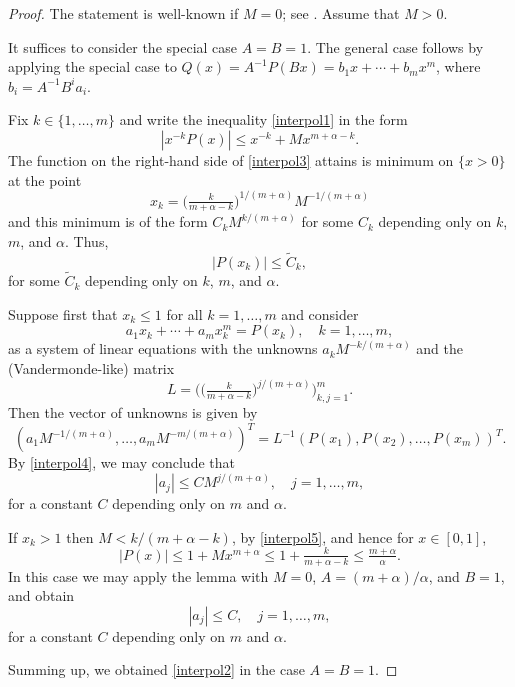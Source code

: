 \documentclass[12pt]{amsart}
\theoremstyle{plain}
\theoremstyle{definition}
\numberwithin{equation}{section}
\begin{document}
\begin{proof}
The statement is well-known if $M=0$; see \cite[Lemma 3.4]{ParusinskiRainerHyp}. Assume that $M>0$.

It suffices to consider the special case $A=B=1$.  
The general case follows by applying the special case to $Q(x)= A^{-1} P(Bx) =  b_1 x + \cdots + b_{m} x^{m}$, where 
$b_i= A^{-1} B^i  {a_i}$.  

Fix $k \in \{1,\ldots,m\}$ and write the inequality \eqref{interpol1} in the form 
\begin{equation} \label{interpol3}
  |x^{-k} P(x)| \le x^{-k} + M x^{m+{\alpha}-k}.
\end{equation}
The function on the right-hand side of \eqref{interpol3} attains is minimum on $\{x>0\}$ at the point 
\begin{equation} \label{interpol5}
  x_k = \big(\tfrac k{m+{\alpha}-k}\big)^{1/(m+{\alpha})} M^{-1/(m+{\alpha})}  
\end{equation}
and this minimum is of the form $C_k M^{k/(m+{\alpha})}$ for some $C_k$ depending only on $k$, $m$, and ${\alpha}$.
Thus, 
\begin{equation} \label{interpol4}
  |P(x_k)| \le \tilde C_k, 
\end{equation}
for some $\tilde C_k$ depending only on $k$, $m$, and ${\alpha}$.

Suppose first that $x_k \le 1$ for all $k= 1,\ldots,m$ and consider 
\begin{equation*}
    a_1 x_k + \cdots + a_{m} x_k^{m} = P(x_k), \quad k= 1,\ldots,m, 
\end{equation*}
as a system of linear equations with the unknowns $a_k M^{-k/(m+{\alpha})}$ and the (Vandermonde-like) matrix 
\begin{equation*}
  L = \big(\big(\tfrac{k}{m+{\alpha}-k}\big)^{j/(m+{\alpha})}\big)_{k,j=1}^{m}.   
\end{equation*} 
Then the vector of unknowns is given by 
\[
  (a_1 M^{-1/(m+{\alpha})}, \ldots , a_{m} M^{-m/(m+{\alpha})})^T = L^{-1}  (P(x_1), P(x_2), \ldots , P(x_{m}))^T.
\] 
By \eqref{interpol4}, we may conclude that 
\[
  |a_j| \le C M^{j/(m+{\alpha})}, \quad j=1,\ldots,m,
\]
for a constant $C$ depending only on $m$ and ${\alpha}$.

If $x_k > 1$ then $M < k/(m+{\alpha}-k)$, by \eqref{interpol5}, and hence for $x \in [0,1]$,
\[
  |P(x)| \le 1+ M x^{m+{\alpha}} \le 1+ \tfrac k {m+{\alpha}-k} \le \tfrac{m+{\alpha}}{\alpha}. 
\]
In this case we may apply the lemma with $M=0$, $A = (m+{\alpha})/{\alpha}$, and $B=1$, and obtain 
\[
  |a_j| \le C , \quad j=1,\ldots,m,
\]
for a constant $C$ depending only on $m$ and ${\alpha}$.

Summing up, we obtained \eqref{interpol2} in the case $A=B=1$.
\end{proof} 
\end{document}
